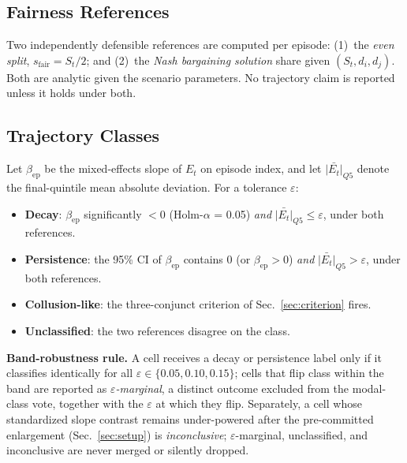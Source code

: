\documentclass[conference]{IEEEtran}
\newcommand{\Et}{E_t}
\newcommand{\eps}{\varepsilon}
\begin{document}
\subsection{Fairness References}
Two independently defensible references are computed per episode:
(1)~the \emph{even split}, $s_{\mathrm{fair}} = S_t/2$; and (2)~the
\emph{Nash bargaining solution} share given $(S_t, d_i, d_j)$. Both are
analytic given the scenario parameters. No trajectory claim is reported unless
it holds under both.

\subsection{Trajectory Classes}\label{sec:classes}
Let $\beta_{\mathrm{ep}}$ be the mixed-effects slope of $\Et$ on episode
index, and let $\bar{|\Et|}_{Q5}$ denote the final-quintile mean absolute
deviation. For a tolerance $\eps$:
\begin{itemize}[leftmargin=1.2em]
\item \textbf{Decay}: $\beta_{\mathrm{ep}}$ significantly $< 0$ (Holm-$\alpha$
= 0.05) \emph{and} $\bar{|\Et|}_{Q5} \leq \eps$, under both references.
\item \textbf{Persistence}: the 95\% CI of $\beta_{\mathrm{ep}}$ contains $0$
(or $\beta_{\mathrm{ep}} > 0$) \emph{and} $\bar{|\Et|}_{Q5} > \eps$, under
both references.
\item \textbf{Collusion-like}: the three-conjunct criterion of
Sec.~\ref{sec:criterion} fires.
\item \textbf{Unclassified}: the two references disagree on the class.
\end{itemize}
\textbf{Band-robustness rule.} A cell receives a decay or persistence label
only if it classifies identically for all $\eps \in \{0.05, 0.10, 0.15\}$;
cells that flip class within the band are reported as \emph{$\eps$-marginal},
a distinct outcome excluded from the modal-class vote, together with the
$\eps$ at which they flip. Separately, a cell whose standardized slope
contrast remains under-powered after the pre-committed enlargement
(Sec.~\ref{sec:setup}) is \emph{inconclusive}; $\eps$-marginal, unclassified,
and inconclusive are never merged or silently dropped.
\end{document}

